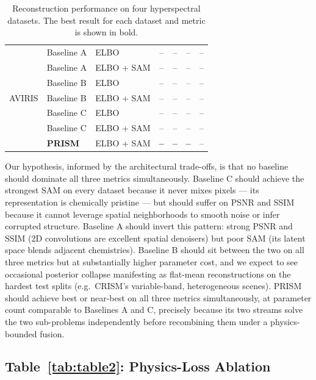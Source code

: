 \documentclass{article} %
\begin{document}
\begin{table}[t]
{\begin{tabular}{lllc c c c}
\multirow{7}{*}{AVIRIS}
& Baseline A & ELBO              & -- & -- & -- & -- \\
& Baseline A & ELBO + SAM   & -- & -- & -- & -- \\
& Baseline B & ELBO              & -- & -- & -- & -- \\
& Baseline B & ELBO + SAM   & -- & -- & -- & -- \\
& Baseline C & ELBO              & -- & -- & -- & -- \\
& Baseline C & ELBO + SAM   & -- & -- & -- & -- \\
& \textbf{PRISM} & ELBO + SAM & \textbf{--} & \textbf{--} & \textbf{--} & -- \\

\bottomrule
\end{tabular}%
}
\caption{
Reconstruction performance on four hyperspectral datasets. The best result for each dataset and metric is shown in bold.
}
\label{tab:table1}
\end{table}


Our hypothesis, informed by the architectural trade-offs, is that no baseline should dominate all three metrics simultaneously. Baseline C should achieve the strongest SAM on every dataset because it never mixes pixels --- its representation is chemically pristine --- but should suffer on PSNR and SSIM because it cannot leverage spatial neighborhoods to smooth noise or infer corrupted structure. Baseline A should invert this pattern: strong PSNR and SSIM (2D convolutions are excellent spatial denoisers) but poor SAM (its latent space blends adjacent chemistries). Baseline B should sit between the two on all three metrics but at substantially higher parameter cost, and we expect to see occasional posterior collapse manifesting as flat-mean reconstructions on the hardest test splits (e.g.\ CRISM's variable-band, heterogeneous scenes). PRISM should achieve best or near-best on all three metrics simultaneously, at parameter count comparable to Baselines A and C, precisely because its two streams solve the two sub-problems independently before recombining them under a physics-bounded fusion.

\subsection{Table~\ref{tab:table2}: Physics-Loss Ablation}
\end{document}
